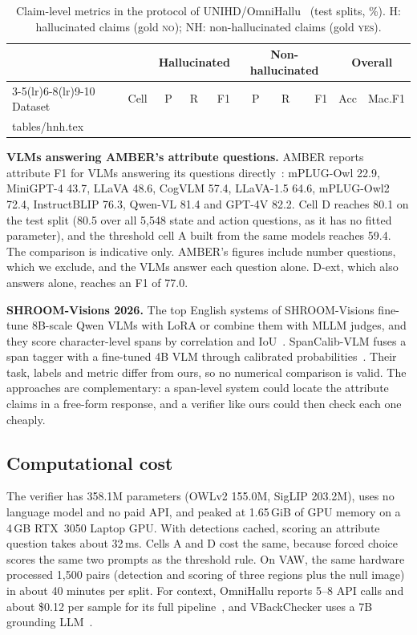 \documentclass[11pt]{article}
\makeatletter
\newcommand{\yes}{\textsc{yes}}
\newcommand{\no}{\textsc{no}}
\newcommand{\tabinput}[1]{\@@input #1 }
\makeatother
\begin{document}
\begin{table}[!htbp]
\centering
\caption{Claim-level metrics in the protocol of UNIHD/OmniHallu~\cite{chen2024unihd,yang2026omnihallu} (test splits, \%). H: hallucinated claims (gold \no); NH: non-hallucinated claims (gold \yes).}
\label{tab:hnh}
\small
\setlength{\tabcolsep}{4pt}
\begin{tabular}{llrrrrrrrr}
\toprule
 & & \multicolumn{3}{c}{Hallucinated} & \multicolumn{3}{c}{Non-hallucinated} & \multicolumn{2}{c}{Overall} \\
\cmidrule(lr){3-5}\cmidrule(lr){6-8}\cmidrule(lr){9-10}
Dataset & Cell & P & R & F1 & P & R & F1 & Acc & Mac.F1 \\
\midrule
\tabinput{tables/hnh.tex}
\bottomrule
\end{tabular}
\end{table}

\textbf{VLMs answering AMBER's attribute questions.} AMBER reports attribute F1 for VLMs answering its questions directly~\cite{wang2023amber}: mPLUG-Owl 22.9, MiniGPT-4 43.7, LLaVA 48.6, CogVLM 57.4, LLaVA-1.5 64.6, mPLUG-Owl2 72.4, InstructBLIP 76.3, Qwen-VL 81.4 and GPT-4V 82.2. Cell D reaches 80.1 on the test split (80.5 over all 5{,}548 state and action questions, as it has no fitted parameter), and the threshold cell A built from the same models reaches 59.4. The comparison is indicative only. AMBER's figures include number questions, which we exclude, and the VLMs answer each question alone. D-ext, which also answers alone, reaches an F1 of 77.0.

\textbf{SHROOM-Visions 2026.} The top English systems of SHROOM-Visions fine-tune 8B-scale Qwen VLMs with LoRA or combine them with MLLM judges, and they score character-level spans by correlation and IoU~\cite{vazquez2026shroomvisions}. SpanCalib-VLM fuses a span tagger with a fine-tuned 4B VLM through calibrated probabilities~\cite{abebe2026spancalib}. Their task, labels and metric differ from ours, so no numerical comparison is valid. The approaches are complementary: a span-level system could locate the attribute claims in a free-form response, and a verifier like ours could then check each one cheaply.

\subsection{Computational cost}\label{sec:cost}
The verifier has 358.1M parameters (OWLv2 155.0M, SigLIP 203.2M), uses no language model and no paid API, and peaked at 1.65\,GiB of GPU memory on a 4\,GB RTX~3050 Laptop GPU. With detections cached, scoring an attribute question takes about 32\,ms. Cells A and D cost the same, because forced choice scores the same two prompts as the threshold rule. On VAW, the same hardware processed 1{,}500 pairs (detection and scoring of three regions plus the null image) in about 40 minutes per split. For context, OmniHallu reports 5--8 API calls and about \$0.12 per sample for its full pipeline~\cite{yang2026omnihallu}, and VBackChecker uses a 7B grounding LLM~\cite{guo2026vbackchecker}.
\end{document}
